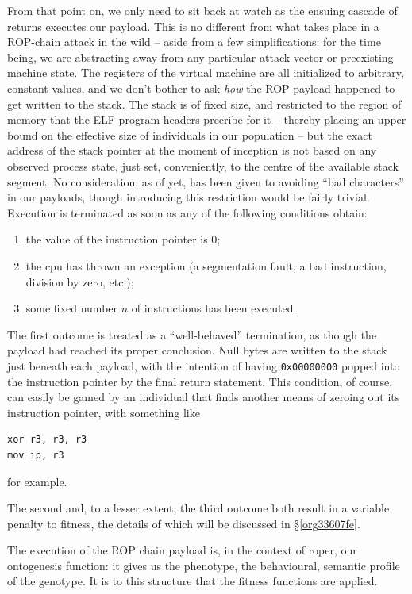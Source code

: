 \documentclass[12pt,glossary]{dalthesis}
\begin{document}
From that point on, we only need to sit back at watch as the ensuing cascade of
returns executes our payload. This is no different from what takes place in
a ROP-chain attack in the wild -- aside from a few simplifications: for the time
being, we are abstracting away from any particular attack vector or preexisting
machine state. The registers of the virtual machine are all initialized to arbitrary,
constant values, and we don't bother to ask \emph{how} the ROP payload happened to get
written to the stack. The stack is of fixed size, and restricted to the region
of memory that the ELF program headers precribe for it -- thereby placing an upper
bound on the effective size of individuals in our population -- but the exact
address of the stack pointer at the moment of inception is not based on any
observed process state, just set, conveniently, to the centre of the available
stack segment. No consideration, as of yet, has been given to avoiding ``bad
characters'' in our payloads, though introducing this restriction would be fairly
trivial. Execution is terminated as soon as any of the following conditions obtain:
\begin{enumerate}
\item the value of the instruction pointer is 0;
\item the \gls{cpu} has thrown an exception (a segmentation fault, a bad instruction,
division by zero, etc.);
\item some fixed number \(n\) of instructions has been executed.
\end{enumerate}

The first outcome is treated as a ``well-behaved'' termination, as though the
payload had reached its proper conclusion. Null bytes are written to the
stack just beneath each payload, with the intention of having \texttt{0x00000000}
popped into the instruction pointer by the final return statement. This condition, 
of course, can easily be gamed by an individual that finds another means of
zeroing out its instruction pointer, with something like
\begin{verbatim}
xor r3, r3, r3
mov ip, r3
\end{verbatim}
for example. 

The second and, to a lesser extent, the third outcome both result in a variable
penalty to fitness, the details of which will be discussed in \S \ref{org33607fe}.

The execution of the ROP chain payload is, in the context of \gls{roper}, our
ontogenesis function: it gives us the phenotype, the behavioural, semantic
profile of the genotype. It is to this structure that the fitness functions
are applied. 
\end{document}
